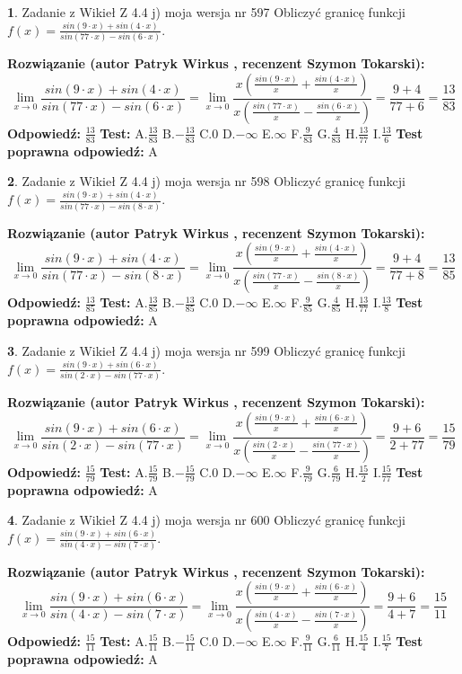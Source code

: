 \documentclass[12pt, a4paper]{article}
\theoremstyle{definition} %
\newtheorem{zad}{}
\newcommand{\zadStart}[1]{\begin{zad}#1\newline}
\newcommand{\zadStop}{\end{zad}}
\newcommand{\rozwStart}[2]{\noindent \textbf{Rozwiązanie (autor #1 , recenzent #2): }\newline}
\newcommand{\rozwStop}{\newline}
\newcommand{\odpStart}{\noindent \textbf{Odpowiedź:}\newline}
\newcommand{\odpStop}{\newline}
\newcommand{\testStart}{\noindent \textbf{Test:}\newline}
\newcommand{\testStop}{\newline}
\newcommand{\kluczStart}{\noindent \textbf{Test poprawna odpowiedź:}\newline}
\newcommand{\kluczStop}{\newline}
\begin{document}
\zadStart{Zadanie z Wikieł Z 4.4 j) moja wersja nr 597}
Obliczyć granicę funkcji $f(x)=\frac{sin(9\cdot x) +sin(4\cdot x)}{sin(77\cdot x) -sin(6\cdot x)}$.
\zadStop
\rozwStart{Patryk Wirkus}{Szymon Tokarski}
$$\lim\limits_{x\to 0}\frac{sin(9\cdot x) +sin(4\cdot x)}{sin(77\cdot x) -sin(6\cdot x)}=\lim\limits_{x\to 0}\frac{x(\frac{sin(9\cdot x)}{x}+\frac{sin(4\cdot x)}{x})}{x(\frac{sin(77\cdot x)}{x}-\frac{sin(6\cdot x)}{x})}=\frac{9+4}{77+6} = \frac{13}{83}$$
\rozwStop
\odpStart
$\frac{13}{83}$
\odpStop
\testStart
A.$\frac{13}{83}$
B.$-\frac{13}{83}$
C.$0$
D.$-\infty$
E.$\infty$
F.$\frac{9}{83}$
G.$\frac{4}{83}$
H.$\frac{13}{77}$
I.$\frac{13}{6}$
\testStop
\kluczStart
A
\kluczStop



\zadStart{Zadanie z Wikieł Z 4.4 j) moja wersja nr 598}
Obliczyć granicę funkcji $f(x)=\frac{sin(9\cdot x) +sin(4\cdot x)}{sin(77\cdot x) -sin(8\cdot x)}$.
\zadStop
\rozwStart{Patryk Wirkus}{Szymon Tokarski}
$$\lim\limits_{x\to 0}\frac{sin(9\cdot x) +sin(4\cdot x)}{sin(77\cdot x) -sin(8\cdot x)}=\lim\limits_{x\to 0}\frac{x(\frac{sin(9\cdot x)}{x}+\frac{sin(4\cdot x)}{x})}{x(\frac{sin(77\cdot x)}{x}-\frac{sin(8\cdot x)}{x})}=\frac{9+4}{77+8} = \frac{13}{85}$$
\rozwStop
\odpStart
$\frac{13}{85}$
\odpStop
\testStart
A.$\frac{13}{85}$
B.$-\frac{13}{85}$
C.$0$
D.$-\infty$
E.$\infty$
F.$\frac{9}{85}$
G.$\frac{4}{85}$
H.$\frac{13}{77}$
I.$\frac{13}{8}$
\testStop
\kluczStart
A
\kluczStop



\zadStart{Zadanie z Wikieł Z 4.4 j) moja wersja nr 599}
Obliczyć granicę funkcji $f(x)=\frac{sin(9\cdot x) +sin(6\cdot x)}{sin(2\cdot x) -sin(77\cdot x)}$.
\zadStop
\rozwStart{Patryk Wirkus}{Szymon Tokarski}
$$\lim\limits_{x\to 0}\frac{sin(9\cdot x) +sin(6\cdot x)}{sin(2\cdot x) -sin(77\cdot x)}=\lim\limits_{x\to 0}\frac{x(\frac{sin(9\cdot x)}{x}+\frac{sin(6\cdot x)}{x})}{x(\frac{sin(2\cdot x)}{x}-\frac{sin(77\cdot x)}{x})}=\frac{9+6}{2+77} = \frac{15}{79}$$
\rozwStop
\odpStart
$\frac{15}{79}$
\odpStop
\testStart
A.$\frac{15}{79}$
B.$-\frac{15}{79}$
C.$0$
D.$-\infty$
E.$\infty$
F.$\frac{9}{79}$
G.$\frac{6}{79}$
H.$\frac{15}{2}$
I.$\frac{15}{77}$
\testStop
\kluczStart
A
\kluczStop



\zadStart{Zadanie z Wikieł Z 4.4 j) moja wersja nr 600}
Obliczyć granicę funkcji $f(x)=\frac{sin(9\cdot x) +sin(6\cdot x)}{sin(4\cdot x) -sin(7\cdot x)}$.
\zadStop
\rozwStart{Patryk Wirkus}{Szymon Tokarski}
$$\lim\limits_{x\to 0}\frac{sin(9\cdot x) +sin(6\cdot x)}{sin(4\cdot x) -sin(7\cdot x)}=\lim\limits_{x\to 0}\frac{x(\frac{sin(9\cdot x)}{x}+\frac{sin(6\cdot x)}{x})}{x(\frac{sin(4\cdot x)}{x}-\frac{sin(7\cdot x)}{x})}=\frac{9+6}{4+7} = \frac{15}{11}$$
\rozwStop
\odpStart
$\frac{15}{11}$
\odpStop
\testStart
A.$\frac{15}{11}$
B.$-\frac{15}{11}$
C.$0$
D.$-\infty$
E.$\infty$
F.$\frac{9}{11}$
G.$\frac{6}{11}$
H.$\frac{15}{4}$
I.$\frac{15}{7}$
\testStop
\kluczStart
A
\kluczStop
\end{document}
